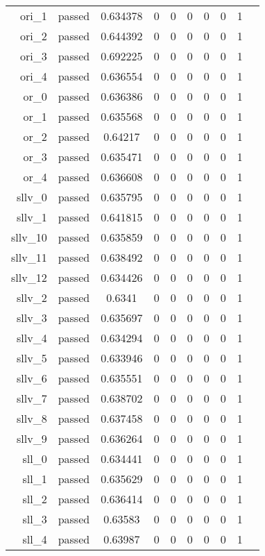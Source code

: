 \begin{longtable}{r|ccccccccc}
    ori\_1 & passed & 0.634378 & 0 & 0 & 0 & 0 & 0 & 1 \\
    ori\_2 & passed & 0.644392 & 0 & 0 & 0 & 0 & 0 & 1 \\
    ori\_3 & passed & 0.692225 & 0 & 0 & 0 & 0 & 0 & 1 \\
    ori\_4 & passed & 0.636554 & 0 & 0 & 0 & 0 & 0 & 1 \\
    or\_0 & passed & 0.636386 & 0 & 0 & 0 & 0 & 0 & 1 \\
    or\_1 & passed & 0.635568 & 0 & 0 & 0 & 0 & 0 & 1 \\
    or\_2 & passed & 0.64217 & 0 & 0 & 0 & 0 & 0 & 1 \\
    or\_3 & passed & 0.635471 & 0 & 0 & 0 & 0 & 0 & 1 \\
    or\_4 & passed & 0.636608 & 0 & 0 & 0 & 0 & 0 & 1 \\
    sllv\_0 & passed & 0.635795 & 0 & 0 & 0 & 0 & 0 & 1 \\
    sllv\_1 & passed & 0.641815 & 0 & 0 & 0 & 0 & 0 & 1 \\
    sllv\_10 & passed & 0.635859 & 0 & 0 & 0 & 0 & 0 & 1 \\
    sllv\_11 & passed & 0.638492 & 0 & 0 & 0 & 0 & 0 & 1 \\
    sllv\_12 & passed & 0.634426 & 0 & 0 & 0 & 0 & 0 & 1 \\
    sllv\_2 & passed & 0.6341 & 0 & 0 & 0 & 0 & 0 & 1 \\
    sllv\_3 & passed & 0.635697 & 0 & 0 & 0 & 0 & 0 & 1 \\
    sllv\_4 & passed & 0.634294 & 0 & 0 & 0 & 0 & 0 & 1 \\
    sllv\_5 & passed & 0.633946 & 0 & 0 & 0 & 0 & 0 & 1 \\
    sllv\_6 & passed & 0.635551 & 0 & 0 & 0 & 0 & 0 & 1 \\
    sllv\_7 & passed & 0.638702 & 0 & 0 & 0 & 0 & 0 & 1 \\
    sllv\_8 & passed & 0.637458 & 0 & 0 & 0 & 0 & 0 & 1 \\
    sllv\_9 & passed & 0.636264 & 0 & 0 & 0 & 0 & 0 & 1 \\
    sll\_0 & passed & 0.634441 & 0 & 0 & 0 & 0 & 0 & 1 \\
    sll\_1 & passed & 0.635629 & 0 & 0 & 0 & 0 & 0 & 1 \\
    sll\_2 & passed & 0.636414 & 0 & 0 & 0 & 0 & 0 & 1 \\
    sll\_3 & passed & 0.63583 & 0 & 0 & 0 & 0 & 0 & 1 \\
    sll\_4 & passed & 0.63987 & 0 & 0 & 0 & 0 & 0 & 1 \\

\end{longtable}
